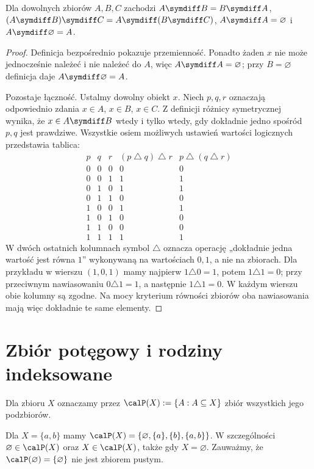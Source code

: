 \begin{twierdzenie}\label{thm:symdiff}
Dla dowolnych zbiorów $A,B,C$ zachodzi
$A\symdiff B=B\symdiff A$,
$(A\symdiff B)\symdiff C=A\symdiff(B\symdiff C)$,
$A\symdiff A=\varnothing$ i $A\symdiff\varnothing=A$.
\end{twierdzenie}
\begin{proof}
Definicja bezpośrednio pokazuje przemienność. Ponadto żaden
$x$ nie może jednocześnie należeć i nie należeć do $A$,
więc $A\symdiff A=\varnothing$; przy $B=\varnothing$
definicja daje $A\symdiff\varnothing=A$.

Pozostaje łączność. Ustalmy dowolny obiekt $x$.
Niech $p,q,r$ oznaczają odpowiednio zdania
$x\in A$, $x\in B$, $x\in C$. Z definicji różnicy
symetrycznej wynika, że $x\in A\symdiff B$ wtedy
i tylko wtedy, gdy dokładnie jedno spośród $p,q$
jest prawdziwe. Wszystkie osiem możliwych ustawień
wartości logicznych przedstawia tablica:
\[
\begin{array}{ccc|cc}
p&q&r&(p\mathbin{\triangle}q)\mathbin{\triangle}r
  &p\mathbin{\triangle}(q\mathbin{\triangle}r)\\\hline
0&0&0&0&0\\
0&0&1&1&1\\
0&1&0&1&1\\
0&1&1&0&0\\
1&0&0&1&1\\
1&0&1&0&0\\
1&1&0&0&0\\
1&1&1&1&1
\end{array}
\]
W dwóch ostatnich kolumnach symbol $\triangle$ oznacza
operację „dokładnie jedna wartość jest równa $1$”
wykonywaną na wartościach $0,1$, a nie na zbiorach.
Dla przykładu w wierszu $(1,0,1)$ mamy najpierw
$1\triangle0=1$, potem $1\triangle1=0$;
przy przeciwnym nawiasowaniu $0\triangle1=1$,
a następnie $1\triangle1=0$. W każdym wierszu
obie kolumny są zgodne. Na mocy kryterium równości
zbiorów oba nawiasowania mają więc dokładnie
te same elementy.
\end{proof}

\section{Zbiór potęgowy i rodziny indeksowane}\label{sec:families}
\begin{definicja}\label{def:powerset}
Dla zbioru $X$ oznaczamy przez
$\calP(X):=\{A:A\subseteq X\}$ zbiór wszystkich jego podzbiorów.
\end{definicja}
\begin{przyklad}
Dla $X=\{a,b\}$ mamy
$\calP(X)=\{\varnothing,\{a\},\{b\},\{a,b\}\}$.
W szczególności $\varnothing\in\calP(X)$ oraz
$X\in\calP(X)$, także gdy $X=\varnothing$.
Zauważmy, że $\calP(\varnothing)=\{\varnothing\}$ nie jest
zbiorem pustym.
\end{przyklad}

